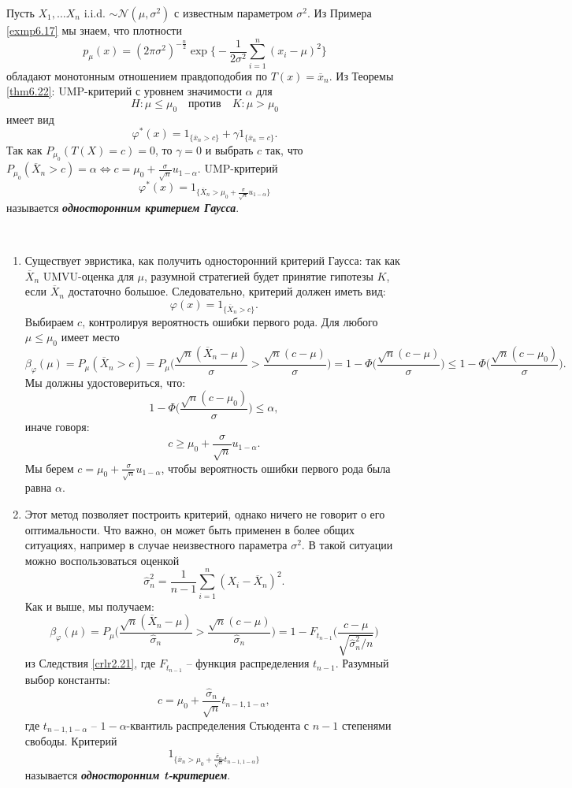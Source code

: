 \begin{exmp}
	Пусть $X_1, \dots X_n$ i.i.d. $\sim \mathcal{N}(\mu, \sigma^2)$ с известным параметром $\sigma^2$. Из Примера \ref{exmp6.17} мы знаем, что плотности
	\[p_\mu(x) = (2 \pi \sigma^2)^{-\frac{n}{2}} \exp \Big\{ -\frac{1}{2\sigma^2}\sum_{i=1}^{n}(x_i - \mu)^2 \Big\} \]
	обладают монотонным отношением правдоподобия по $T(x) = \overline{x}_n$. Из Теоремы \ref{thm6.22}: UMP-критерий с уровнем значимости $\alpha$ для
	\[ H:\mu \leq \mu_0 \quad \text{против} \quad K:\mu > \mu_0  \]
	имеет вид
	\[ \varphi^*(x) = 1_{\{\overline{x}_n > c\}} + \gamma 1_{\{\overline{x}_n = c\}}. \]
	Так как $P_{\mu_0}(T(X) = c) = 0$, то $\gamma = 0$ и выбрать $c$ так, что $P_{\mu_0}(\overline{X}_n > c) = \alpha \Longleftrightarrow c = \mu_0 + \frac{\sigma}{\sqrt{n}} u_{1-\alpha}$. UMP-критерий
	\[ \varphi^*(x) = 1_{\{\overline{X}_n > \mu_0 + \frac{\sigma}{\sqrt{n}}u_{1-\alpha} \} } \]
	называется \textbf{\textit{односторонним критерием Гаусса}}.
\end{exmp}

\begin{rmrk} \
	\begin{enumerate}
		\item Существует эвристика, как получить односторонний критерий Гаусса: так как $\overline{X}_n$ UMVU-оценка для $\mu$, разумной стратегией будет принятие гипотезы $K$, если $\overline{X}_n$ достаточно большое. Следовательно, критерий должен иметь вид:
		\[\varphi(x) = 1_{\{\overline{X}_n > c\}}.  \]
		Выбираем $c$, контролируя вероятность ошибки первого рода. Для любого $\mu \leq \mu_0$ имеет место
		\[ \beta_\varphi(\mu) = P_\mu(\overline{X}_n > c) = P_\mu \Big( \frac{\sqrt{n}(\overline{X}_n - \mu) }{\sigma} > \frac{\sqrt{n}(c-\mu)}{\sigma}\Big) = 1 - \Phi\Big(\frac{\sqrt{n}(c-\mu)}{\sigma}\Big) \leq 1 - \Phi\Big(\frac{\sqrt{n}(c-\mu_0)}{\sigma}\Big).\]
		Мы должны удостовериться, что:
		\[ 1- \Phi\Big(\frac{\sqrt{n}(c-\mu_0)}{\sigma}\Big) \leq \alpha, \]
		иначе говоря:
		\[c \geq \mu_0 + \frac{\sigma}{\sqrt{n}} u_{1-\alpha}.\] 
		Мы берем $c = \mu_0 + \frac{\sigma}{\sqrt{n}} u_{1-\alpha}$, чтобы вероятность ошибки первого рода была равна $\alpha$.
		\item Этот метод позволяет построить критерий, однако ничего не говорит о его оптимальности. Что важно, он может быть применен в более общих ситуациях, например в случае неизвестного параметра $\sigma^2$. В такой ситуации можно воспользоваться оценкой
		\[ \hat{\sigma}_n^2 = \frac{1}{n-1}\sum_{i=1}^{n}(X_i - \overline{X}_n)^2. \]
		Как и выше, мы получаем:
		\[ \beta_\varphi(\mu) = P_\mu\Big( \frac{\sqrt{n}(\overline{X}_n - \mu) }{\hat{\sigma}_n} > \frac{\sqrt{n}(c-\mu)}{\hat{\sigma}_n}\Big) = 1 - F_{t_{n-1}}\Big( \frac{c - \mu}{\sqrt{\hat{\sigma}_n^2 / n}} \Big)  \]
		из Следствия \ref{crlr2.21}, где $F_{t_{n-1}}$ -- функция распределения $t_{n-1}$. Разумный выбор константы:
		\[ c = \mu_0 + \frac{\hat{\sigma}_n}{\sqrt{n}}t_{n-1,1-\alpha}, \]
		где $t_{n-1, 1-\alpha}$ -- $1-\alpha$-квантиль распределения Стьюдента с $n-1$ степенями свободы. Критерий
		\[ 1_{\{ \overline{x}_n > \mu_0 + \frac{\hat{\sigma}_n}{\sqrt{n}}t_{n-1,1-\alpha} \}} \]
		называется \textbf{\textit{односторонним t-критерием}}.
	\end{enumerate}
\end{rmrk}

